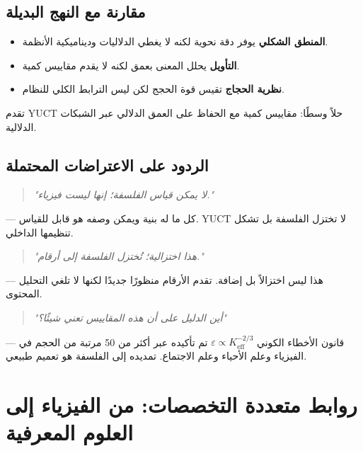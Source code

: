 \documentclass[11pt,a4paper]{article}
\newcommand{\eps}{\varepsilon}
\begin{document}
	\subsection{مقارنة مع النهج البديلة}
	
	\begin{itemize}
		\item \textbf{المنطق الشكلي} يوفر دقة نحوية لكنه لا يغطي الدلاليات وديناميكية الأنظمة.
		\item \textbf{التأويل} يحلل المعنى بعمق لكنه لا يقدم مقاييس كمية.
		\item \textbf{نظرية الحجاج} تقيس قوة الحجج لكن ليس الترابط الكلي للنظام.
	\end{itemize}
	تقدم YUCT حلاً وسطًا: مقاييس كمية مع الحفاظ على العمق الدلالي عبر الشبكات الدلالية.
	
	\subsection{الردود على الاعتراضات المحتملة}
	
	\begin{quote}
		\textit{"لا يمكن قياس الفلسفة؛ إنها ليست فيزياء."}
	\end{quote}
	— كل ما له بنية ويمكن وصفه هو قابل للقياس. YUCT لا تختزل الفلسفة بل تشكل تنظيمها الداخلي.
	
	\begin{quote}
		\textit{"هذا اختزالية؛ تُختزل الفلسفة إلى أرقام."}
	\end{quote}
	— هذا ليس اختزالاً بل إضافة. تقدم الأرقام منظورًا جديدًا لكنها لا تلغي التحليل المحتوى.
	
	\begin{quote}
		\textit{"أين الدليل على أن هذه المقاييس تعني شيئًا؟"}
	\end{quote}
	— قانون الأخطاء الكوني \(\eps \propto K_{\mathrm{eff}}^{-2/3}\) تم تأكيده عبر أكثر من 50 مرتبة من الحجم في الفيزياء وعلم الأحياء وعلم الاجتماع. تمديده إلى الفلسفة هو تعميم طبيعي.
	
	\section{روابط متعددة التخصصات: من الفيزياء إلى العلوم المعرفية}
	\label{sec:interdisciplinary}
	
\end{document}
